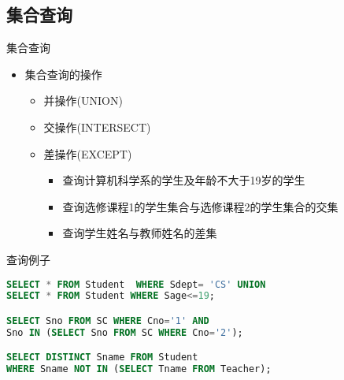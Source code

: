 \subsection{集合查询}
\begin{frame}[fragile]{集合查询}
\begin{itemize}
    \item 集合查询的操作
    \begin{itemize}
        \item 并操作(UNION)
        \item 交操作(INTERSECT)
        \item 差操作(EXCEPT)
        \begin{itemize}
            \item 查询计算机科学系的学生及年龄不大于19岁的学生
            \item 查询选修课程1的学生集合与选修课程2的学生集合的交集
            \item 查询学生姓名与教师姓名的差集
        \end{itemize}

    \end{itemize}
\end{itemize}
\begin{block}{查询例子}
\begin{lstlisting}[language=SQL]
SELECT * FROM Student  WHERE Sdept= 'CS' UNION
SELECT * FROM Student WHERE Sage<=19;

SELECT Sno FROM SC WHERE Cno='1' AND 
Sno IN (SELECT Sno FROM SC WHERE Cno='2');

SELECT DISTINCT Sname FROM Student
WHERE Sname NOT IN (SELECT Tname FROM Teacher);

\end{lstlisting}
\end{block}
\end{frame}

